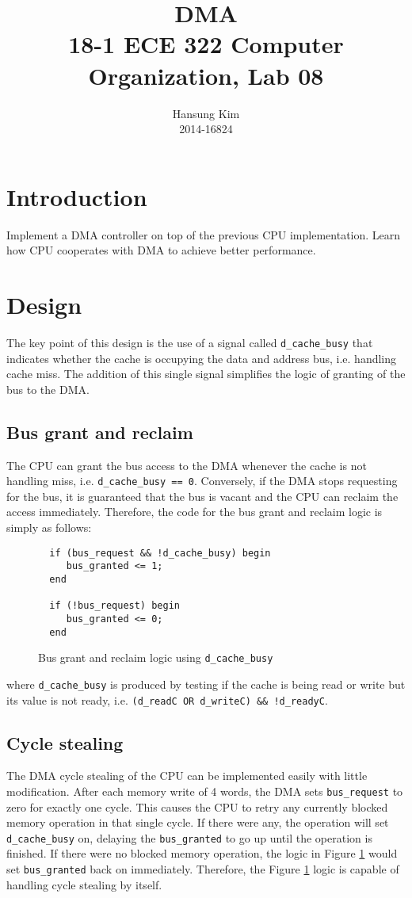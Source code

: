 \documentclass[12pt]{article}
\title{DMA \\
\large 18-1 ECE 322 Computer Organization, Lab 08}
\author{Hansung Kim \\ 2014-16824}
\date{}
\begin{document}
\maketitle

\section{Introduction}
Implement a DMA controller on top of the previous CPU implementation.
Learn how CPU cooperates with DMA to achieve better performance.

\section{Design}

The key point of this design is the use of a signal called
\verb|d_cache_busy| that indicates whether the cache is occupying the
data and address bus, i.e. handling cache miss.  The addition of this
single signal simplifies the logic of granting of the bus to the DMA.

\subsection{Bus grant and reclaim}

The CPU can grant the bus access to the DMA whenever the cache is not
handling miss, i.e. \verb|d_cache_busy == 0|.  Conversely, if the DMA
stops requesting for the bus, it is guaranteed that the bus is vacant
and the CPU can reclaim the access immediately.  Therefore, the code
for the bus grant and reclaim logic is simply as follows:

\begin{figure}[ht]
  \centering
  \begin{BVerbatim}
  if (bus_request && !d_cache_busy) begin
     bus_granted <= 1;
  end

  if (!bus_request) begin
     bus_granted <= 0;
  end
  \end{BVerbatim}
  \caption{Bus grant and reclaim logic using \texttt{d\_cache\_busy}}
  \label{fig:bus-logic}
\end{figure}

where \verb|d_cache_busy| is produced by testing if the cache is being
read or write but its value is not ready, i.e.  \texttt{(d\_readC OR
  d\_writeC) \&\& !d\_readyC}.

\subsection{Cycle stealing}
The DMA cycle stealing of the CPU can be implemented easily with
little modification.  After each memory write of 4 words, the DMA sets
\verb|bus_request| to zero for exactly one cycle.  This causes the CPU
to retry any currently blocked memory operation in that single cycle.
If there were any, the operation will set \verb|d_cache_busy| on,
delaying the \verb|bus_granted| to go up until the operation is
finished.  If there were no blocked memory operation, the logic in
Figure \ref{fig:bus-logic} would set \verb|bus_granted| back on
immediately.  Therefore, the Figure \ref{fig:bus-logic} logic is
capable of handling cycle stealing by itself.
\end{document}
